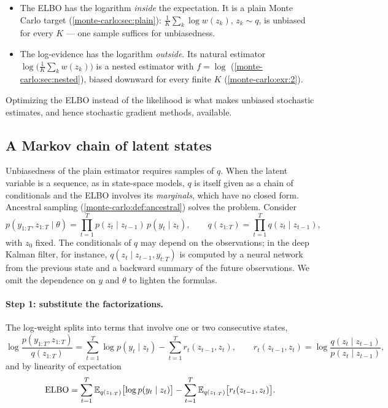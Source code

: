 \begin{notechapter}
\begin{keyidea}
\begin{itemize}[nosep]
  \item The ELBO has the logarithm \emph{inside} the expectation. It is a plain
        Monte Carlo target (\cref{monte-carlo:sec:plain}):
        $\frac1K\sum_k\log w(z_k)$, $z_k\sim q$, is unbiased for every $K$ --- one
        sample suffices for unbiasedness.
  \item The log-evidence has the logarithm \emph{outside}. Its natural estimator
        $\log\bigl(\frac1K\sum_kw(z_k)\bigr)$ is a nested estimator with $f = \log$
        (\cref{monte-carlo:sec:nested}), biased downward for every finite $K$
        (\cref{monte-carlo:exr:2}).
\end{itemize}
Optimizing the ELBO instead of the likelihood is what makes unbiased stochastic
estimates, and hence stochastic gradient methods, available.
\end{keyidea}

\subsection{A Markov chain of latent states}

Unbiasedness of the plain estimator requires samples of $q$. When the latent
variable is a sequence, as in state-space models, $q$ is itself given as a chain of
conditionals and the ELBO involves its \emph{marginals}, which have no closed form.
Ancestral sampling (\cref{monte-carlo:def:ancestral}) solves the problem. Consider
\[
  p(y_{1:T}, z_{1:T}\mid\theta) = \prod_{t=1}^Tp(z_t\mid z_{t-1})\,p(y_t\mid z_t),\qquad
  q(z_{1:T}) = \prod_{t=1}^Tq(z_t\mid z_{t-1}),
\]
with $z_0$ fixed. The conditionals of $q$ may depend on the observations; in the
deep Kalman filter, for instance, $q(z_t\mid z_{t-1}, y_{t:T})$ is computed by a
neural network from the previous state and a backward summary of the future
observations. We omit the dependence on $y$ and $\theta$ to lighten the formulas.

\paragraph{Step 1: substitute the factorizations.} The log-weight splits into terms
that involve one or two consecutive states,
\[
  \log\frac{p(y_{1:T},z_{1:T})}{q(z_{1:T})}
  = \sum_{t=1}^T\log p(y_t\mid z_t) - \sum_{t=1}^Tr_t(z_{t-1},z_t),\qquad
  r_t(z_{t-1},z_t) = \log\frac{q(z_t\mid z_{t-1})}{p(z_t\mid z_{t-1})},
\]
and by linearity of expectation
\[
  \mathrm{ELBO} = \sum_{t=1}^T\mathbb{E}_{q(z_{1:T})}\bigl[\log p(y_t\mid z_t)\bigr]
  - \sum_{t=1}^T\mathbb{E}_{q(z_{1:T})}\bigl[r_t(z_{t-1},z_t)\bigr].
\]


\end{notechapter}
